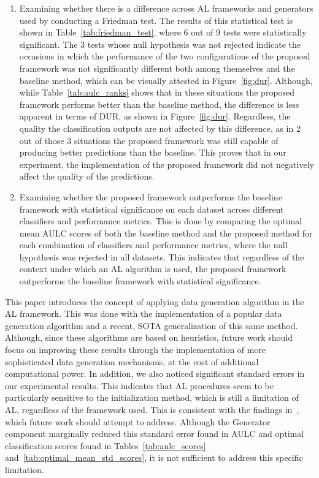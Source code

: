 \documentclass[preprint,12pt]{elsarticle}
\begin{document}
\begin{enumerate}
    \item Examining whether there is a difference across AL frameworks and
        generators used by conducting a Friedman test. The results of this
        statistical test is shown in Table~\ref{tab:friedman_test}, where 6
        out of 9 tests were statistically significant. The 3 tests whose
        null hypothesis was not rejected indicate the occasions in which the
        performance of the two configurations of the proposed framework was
        not significantly different both among themselves and the baseline
        method, which can be visually attested in Figure~\ref{fig:dur}.
        Although, while Table~\ref{tab:aulc_ranks} shows that in these
        situations the proposed framework performs better than the baseline
        method, the difference is less apparent in terms of DUR, as shown in
        Figure~\ref{fig:dur}. Regardless, the quality the classification
        outputs are not affected by this difference, as in 2 out of those
        3 situations the proposed framework was still capable of producing
        better predictions than the baseline. This proves that in our
        experiment, the implementation of the proposed framework did not
        negatively affect the quality of the predictions.
    \item Examining whether the proposed framework outperforms the baseline
        framework with statistical significance on each dataset across
        different classifiers and performance metrics. This is done
        by comparing the optimal mean AULC scores of both the baseline method
        and the proposed method for each combination of classifiers and
        performance metrics, where the null hypothesis was rejected in all
        datasets. This indicates that regardless of the context under which an
        AL algorithm is used, the proposed framework outperforms the baseline
        framework with statistical significance.
\end{enumerate}

This paper introduces the concept of applying data generation algorithm in the
AL framework. This was done with the implementation of a popular data
generation algorithm and a recent, SOTA generalization of this same method.
Although, since these algorithms are based on heuristics, future work should
focus on improving these results through the implementation of more
sophisticated data generation mechanisms, at the cost of additional
computational power. In addition, we also noticed significant standard
errors in our experimental results. This indicates that AL procedures seem to
be particularly sensitive to the initialization method, which is
still a limitation of AL, regardless of the framework used. This is
consistent with the findings in~\cite{Kottke2017}, which future work should
attempt to address. Although the Generator component marginally reduced this
standard error found in AULC and optimal classification scores found in
Tables~\ref{tab:aulc_scores} and~\ref{tab:optimal_mean_std_scores}, it is not
sufficient to address this specific limitation.
\end{document}
